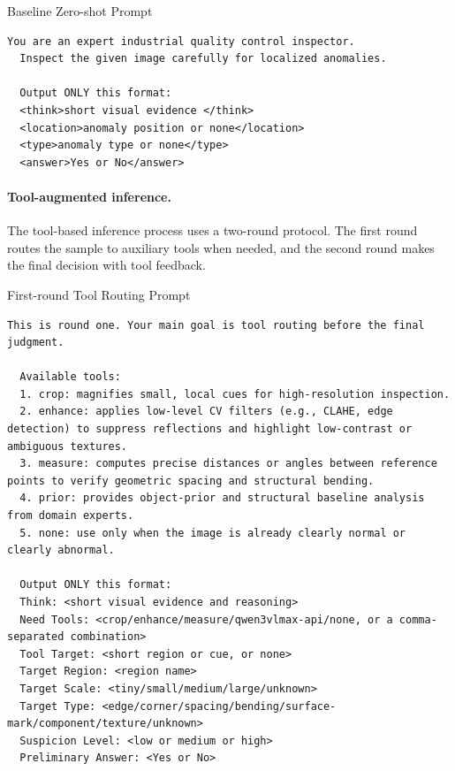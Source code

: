 \documentclass{llmxive}
\begin{document}
{  \begin{promptbox}{Baseline Zero-shot Prompt}
  \begin{lstlisting}[style=promptstyle]
  You are an expert industrial quality control inspector.
  Inspect the given image carefully for localized anomalies.
  
  Output ONLY this format:
  <think>short visual evidence </think>
  <location>anomaly position or none</location>
  <type>anomaly type or none</type>
  <answer>Yes or No</answer>
  \end{lstlisting}
  \end{promptbox}

  

  \paragraph{Tool-augmented inference.}
  The tool-based inference process uses a two-round protocol. The first round routes the sample
  to auxiliary tools when needed, and the second round makes the final decision with tool feedback.

  \begin{promptbox}{First-round Tool Routing Prompt}
  \begin{lstlisting}[style=promptstyle]
  This is round one. Your main goal is tool routing before the final judgment.

  Available tools:
  1. crop: magnifies small, local cues for high-resolution inspection.
  2. enhance: applies low-level CV filters (e.g., CLAHE, edge detection) to suppress reflections and highlight low-contrast or ambiguous textures.
  3. measure: computes precise distances or angles between reference points to verify geometric spacing and structural bending.
  4. prior: provides object-prior and structural baseline analysis from domain experts.
  5. none: use only when the image is already clearly normal or clearly abnormal.

  Output ONLY this format:
  Think: <short visual evidence and reasoning>
  Need Tools: <crop/enhance/measure/qwen3vlmax-api/none, or a comma-separated combination>
  Tool Target: <short region or cue, or none>
  Target Region: <region name>
  Target Scale: <tiny/small/medium/large/unknown>
  Target Type: <edge/corner/spacing/bending/surface-mark/component/texture/unknown>
  Suspicion Level: <low or medium or high>
  Preliminary Answer: <Yes or No>
  \end{lstlisting}
  \end{promptbox}

}
\end{document}
